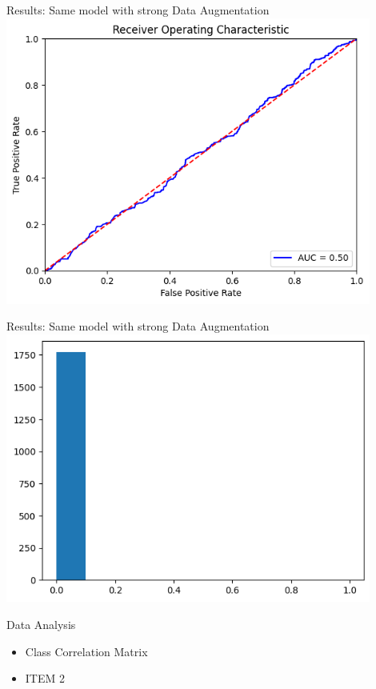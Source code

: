 \begin{frame}{Results: Same model with strong Data Augmentation}
    \centering
    \includegraphics[height=0.9\textheight,width=0.9\textwidth,keepaspectratio]{images/ROC_Curve_DA.png}   
\end{frame}

\begin{frame}{Results: Same model with strong Data Augmentation}
    \centering
    \includegraphics[height=0.9\textheight,width=0.9\textwidth,keepaspectratio]{images/distribution_DA.png}   
\end{frame}



\begin{frame}{Data Analysis}
    \begin{itemize}
        \item Class Correlation Matrix
        \item ITEM 2
    \end{itemize}    
\end{frame}

